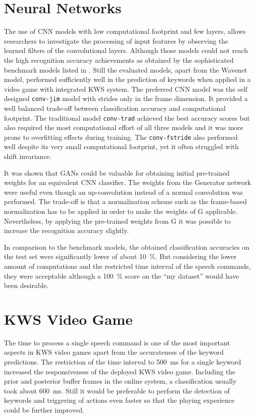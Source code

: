 \section{Neural Networks}
The use of CNN models with low computational footprint and few layers, allows researchers to investigate the processing of input features by observing the learned filters of the convolutional layers.
Although those models could not reach the high recognition accuracy achievements as obtained by the sophisticated benchmark models listed in .
Still the evaluated models, apart from the Wavenet model, performed sufficiently well in the prediction of keywords when applied in a video game with integrated KWS system.
The preferred CNN model was the self designed \texttt{conv-jim} model with strides only in the frame dimension.
It provided a well balanced trade-off between classification accuracy and computational footprint.
The traditional model \texttt{conv-trad} achieved the best accuracy scores but also required the most computational effort of all three models and it was more prone to overfitting effects during training.
The \texttt{conv-fstride} also performed well despite its very small computational footprint, yet it often struggled with shift invariance.

It was shown that GANs could be valuable for obtaining initial pre-trained weights for an equivalent CNN classifier.
The weights from the Generator network were useful even though an up-convolution instead of a normal convolution was performed.
The trade-off is that a normalization scheme such as the frame-based normalization has to be applied in order to make the weights of G applicable.
Nevertheless, by applying the pre-trained weights from G it was possible to increase the recognition accuracy slightly.

In comparison to the benchmark models, the obtained classification accuracies on the test set were significantly lower of about \SI{10}{\percent}.
But considering the lower amount of computations and the restricted time interval of the speech commands, they were acceptable although a \SI{100}{\percent} score on the \enquote{my dataset} would have been desirable.



\section{KWS Video Game}
The time to process a single speech command is one of the most important aspects in KWS video games apart from the accurateness of the keyword predictions.
The restriction of the time interval to \SI{500}{\milli\second} for a single keyword increased the responsiveness of the deployed KWS video game.
Including the prior and posterior buffer frames in the online system, a classification usually took about \SI{600}{\milli\second}.
Still it would be preferable to perform the detection of keywords and triggering of actions even faster so that the playing experience could be further improved.

